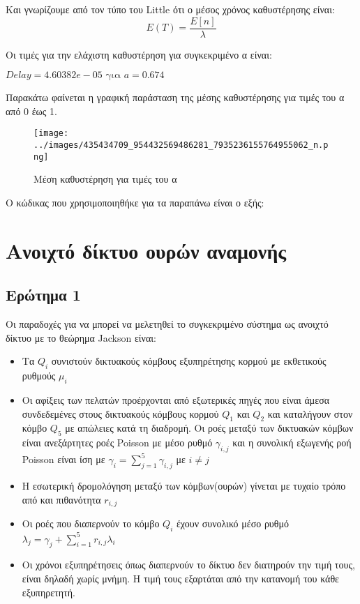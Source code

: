 \documentclass[12pt]{article}
\begin{document}
Και γνωρίζουμε από τον τύπο του Little ότι ο μέσος χρόνος καθυστέρησης είναι: 
\begin{equation}
    Ε(Τ) = \frac{E[n]}{\lambda}
\end{equation}

Οι τιμές για την ελάχιστη καθυστέρηση για συγκεκριμένο α είναι:\\
\begin{center}
$Delay=4.60382e-05 \text{ για } a=0.674$
\end{center}
Παρακάτω φαίνεται η γραφική παράσταση της μέσης καθυστέρησης για τιμές του α από 0 έως 1.
\begin{figure}[H]
    \centering
    \texttt{[image: ../images/435434709\_954432569486281\_7935236155764955062\_n.png]}
    \caption{Μέση καθυστέρηση για τιμές του α}
\end{figure}

Ο κώδικας που χρησιμοποιηθήκε για τα παραπάνω είναι ο εξής:

\pagebreak

\section{Ανοιχτό δίκτυο ουρών αναμονής}
\subsection{Ερώτημα 1}
Οι παραδοχές για να μπορεί να μελετηθεί το συγκεκριμένο σύστημα ως ανοιχτό δίκτυο 
με το θεώρημα Jackson είναι: 
\begin{itemize}
    \item{Τα $Q_i$ συνιστούν δικτυακούς κόμβους εξυπηρέτησης κορμού με εκθετικούς ρυθμούς 
        $\mu_i$}
    \item{Οι αφίξεις των πελατών προέρχονται από εξωτερικές πηγές που είναι άμεσα συνδεδεμένες 
        στους δικτυακούς κόμβους κορμού $Q_1$ και $Q_2$ και καταλήγουν στον κόμβο $Q_5$ με 
        απώλειες κατά τη διαδρομή. Οι ροές μεταξύ των δικτυακών κόμβων είναι ανεξάρτητες 
        ροές Poisson με μέσο ρυθμό $\gamma_{i,j}$ και η συνολική εξωγενής ροή Poisson είναι 
    ίση με $\gamma_i = \sum_{j=1}^{5} \gamma_{i,j}$ με $i \neq j$}
    \item{Η εσωτερική δρομολόγηση μεταξύ των κόμβων(ουρών) γίνεται με τυχαίο τρόπο από 
            και πιθανότητα $r_{i,j}$}
    \item{Οι ροές που διαπερνούν το κόμβο $Q_i$ έχουν συνολικό μέσο ρυθμό 
        $\lambda_j = \gamma_j + \sum_{i=1}^{5} r_{i,j}  \lambda_i$}
    \item{Οι χρόνοι εξυπηρέτησεις όπως διαπερνούν το δίκτυο δεν διατηρούν την τιμή τους, 
        είναι δηλαδή χωρίς μνήμη. Η τιμή τους εξαρτάται από την κατανομή του κάθε εξυπηρετητή.}
\end{itemize}
\end{document}
